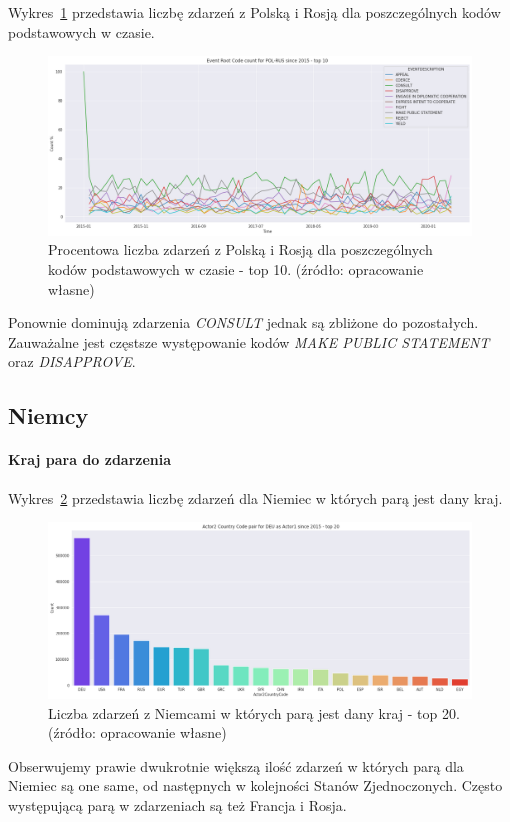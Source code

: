\documentclass[11pt]{report}
\begin{document}
    Wykres~\ref{fig:PLRUSERC} przedstawia liczbę zdarzeń z Polską i Rosją dla poszczególnych kodów podstawowych w czasie.
    \begin{figure}[!htp]
        \centering
        \includegraphics[width=\linewidth]{fig/PL/POLRUSERCperc.png}
        \caption{Procentowa liczba zdarzeń z Polską i Rosją dla poszczególnych kodów podstawowych w czasie - top 10. (źródło: opracowanie własne)}
        \label{fig:PLRUSERC}
    \end{figure}
    Ponownie dominują zdarzenia \textit{CONSULT} jednak są zbliżone do pozostałych.
    Zauważalne jest częstsze występowanie kodów \textit{MAKE PUBLIC STATEMENT} oraz \textit{DISAPPROVE}.

    \subsection{Niemcy}

    \paragraph{Kraj para do zdarzenia}

    Wykres~\ref{fig:DEUpair} przedstawia liczbę zdarzeń dla Niemiec w których parą jest dany kraj.
    \begin{figure}[!htp]
        \centering
        \includegraphics[width=\linewidth]{fig/DEU/DEUactor2Pair.png}
        \caption{Liczba zdarzeń z Niemcami w których parą jest dany kraj - top 20. (źródło: opracowanie własne)}
        \label{fig:DEUpair}
    \end{figure}
    Obserwujemy prawie dwukrotnie większą ilość zdarzeń w których parą dla Niemiec są one same, od następnych w kolejności Stanów Zjednoczonych.
    Często występującą parą w zdarzeniach są też Francja i Rosja.
\end{document}
